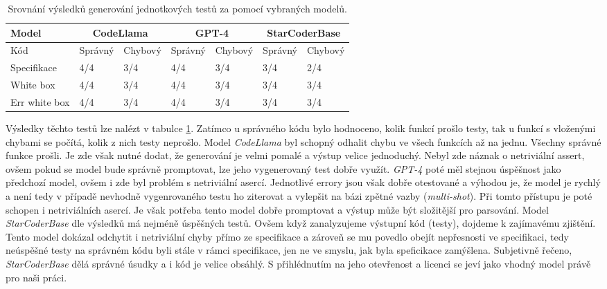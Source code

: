\documentclass[czech, ma, kiv, he, iso690alph, pdf, viewonly]{fasthesis}
\begin{document}
        \begin{table}[h]
            \centering
            \begin{tabular}{|l|l|l|l|l|l|l|}
            \hline
                \textbf{Model} & \multicolumn{2}{c|}{\textbf{CodeLlama}} & \multicolumn{2}{c|}{\textbf{GPT-4}} & \multicolumn{2}{c|}{\textbf{StarCoderBase}} \\ \hline
            Kód           & Správný              & Chybový            & Správný                   & Chybový & Správný                   & Chybový \\ \hline \hline
                Specifikace            & 4/4        & 3/4           & 4/4 & 3/4                    & 3/4 & 2/4 \\ \hline
                White box        & 4/4        & 3/4            & 4/4 & 3/4                    & 3/4 & 3/4 \\ \hline
                Err white box    & 4/4        & 3/4            & 4/4 & 3/4                    & 3/4 & 3/4 \\ \hline
            \end{tabular}
            \caption{Srovnání výsledků generování jednotkových testů za pomocí vybraných modelů.}
            \label{tab:custom_benchmark}
        \end{table}

        Výsledky těchto testů lze nalézt v tabulce \ref{tab:custom_benchmark}. Zatímco u správného kódu bylo hodnoceno, kolik funkcí prošlo testy, tak u funkcí s vloženými chybami se počítá, kolik z nich testy neprošlo. Model \textit{CodeLlama} byl schopný odhalit chybu ve všech funkcích až na jednu. Všechny správné funkce prošli. Je zde však nutné dodat, že generování je velmi pomalé a výstup velice jednoduchý. Nebyl zde náznak o netriviální assert, ovšem pokud se model bude správně promptovat, lze jeho vygenerovaný test dobře využít. \textit{GPT-4} poté měl stejnou úspěšnost jako předchozí model, ovšem i zde byl problém s netriviální asercí. Jednotlivé errory jsou však dobře otestované a výhodou je, že model je rychlý a není tedy v případě nevhodně vygenrovaného testu ho ziterovat a vylepšit na bázi zpětné vazby (\emph{multi-shot}). Při tomto přístupu je poté schopen i netriviálních asercí. Je však potřeba tento model dobře promptovat a výstup může být složitější pro parsování. Model \textit{StarCoderBase} dle výsledků má nejméně úspěšných testů. Ovšem když zanalyzujeme výstupní kód (testy), dojdeme k zajímavému zjištění. Tento model dokázal odchytit i netriviální chyby přímo ze specifikace a zároveň se mu povedlo obejít nepřesnosti ve specifikaci, tedy neúspěšné testy na správném kódu byli stále v rámci specifikace, jen ne ve smyslu, jak byla speficikace zamýšlena. Subjetivně řečeno, \textit{StarCoderBase} dělá správné úsudky a i kód je velice obsáhlý. S přihlédnutím na jeho otevřenost a licenci se jeví jako vhodný model právě pro naši práci.
\end{document}
